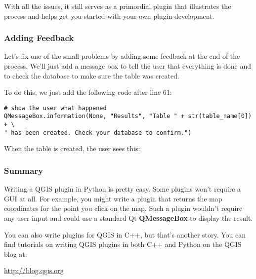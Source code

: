 With all the issues, it still serves as a primordial plugin that illustrates 
the process and helps get you started with your own plugin development.

\subsubsection{Adding Feedback}

Let's fix one of the small problems by adding some feedback at the end of 
the process. We'll just add a message box to tell the user that everything 
is done and to check the database to make sure the table was created.

To do this, we just add the following code after line 61:

\begin{verbatim}
# show the user what happened
QMessageBox.information(None, "Results", "Table " + str(table_name[0]) + \
" has been created. Check your database to confirm.")
\end{verbatim}

When the table is created, the user sees this:


\subsubsection{Summary}
Writing a QGIS plugin in Python is pretty easy. Some plugins won't require a
GUI at all. For example, you might write a plugin that returns the map
coordinates for the point you click on the map. Such a plugin wouldn't
require any user input and could use a standard Qt \textbf{QMessageBox}
to display the result. 

You can also write plugins for QGIS in C++, but that's another story. You can 
find tutorials on writing QGIS plugins in both C++ and Python on the QGIS 
blog at:

\begin{center}
  \url{http://blog.qgis.org} 
\end{center}

